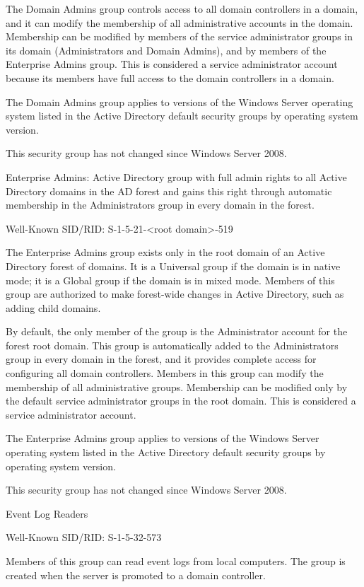 The Domain Admins group controls access to all domain controllers in a domain, and it can modify the membership of all administrative accounts in the domain. Membership can be modified by members of the service administrator groups in its domain (Administrators and Domain Admins), and by members of the Enterprise Admins group. This is considered a service administrator account because its members have full access to the domain controllers in a domain.

The Domain Admins group applies to versions of the Windows Server operating system listed in the Active Directory default security groups by operating system version.

This security group has not changed since Windows Server 2008.

Enterprise Admins: Active Directory group with full admin rights to all Active Directory domains in the AD forest and gains this right through automatic membership in the Administrators group in every domain in the forest.

Well-Known SID/RID: S-1-5-21-<root domain>-519

The Enterprise Admins group exists only in the root domain of an Active Directory forest of domains. It is a Universal group if the domain is in native mode; it is a Global group if the domain is in mixed mode. Members of this group are authorized to make forest-wide changes in Active Directory, such as adding child domains.

By default, the only member of the group is the Administrator account for the forest root domain. This group is automatically added to the Administrators group in every domain in the forest, and it provides complete access for configuring all domain controllers. Members in this group can modify the membership of all administrative groups. Membership can be modified only by the default service administrator groups in the root domain. This is considered a service administrator account.

The Enterprise Admins group applies to versions of the Windows Server operating system listed in the Active Directory default security groups by operating system version.

This security group has not changed since Windows Server 2008.

Event Log Readers

Well-Known SID/RID: S-1-5-32-573

Members of this group can read event logs from local computers. The group is created when the server is promoted to a domain controller.

